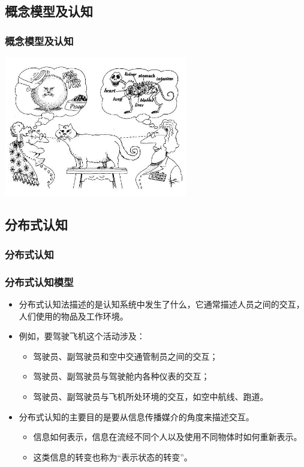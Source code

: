 \documentclass{beamer}
\begin{document}
\subsection{概念模型及认知}
\begin{frame}
	\frametitle{概念模型及认知}
	\begin{center}
		\includegraphics[width=8cm]{images/viewpoint.jpg}
	\end{center}
\end{frame}

\subsection{分布式认知}
\begin{frame}
	\frametitle{分布式认知}

\end{frame}

\begin{frame}
	\frametitle{分布式认知模型}
	\beamertemplatetransparentcovereddynamicmedium
	\begin{itemize}
		\item 分布式认知法描述的是认知系统中发生了什么，它通常描述人员之间的交互，人们使用的物品及工作环境。\pause
		\item 例如，要驾驶飞机这个活动涉及：
		\begin{itemize}
			\item 驾驶员、副驾驶员和空中交通管制员之间的交互；
			\item 驾驶员、副驾驶员与驾驶舱内各种仪表的交互；
			\item 驾驶员、副驾驶员与飞机所处环境的交互，如空中航线、跑道。
		\end{itemize}\pause
		\item 分布式认知的主要目的是要从信息传播媒介的角度来描述交互。
		\begin{itemize}
			\item 信息如何表示，信息在流经不同个人以及使用不同物体时如何重新表示。
			\item 这类信息的转变也称为“表示状态的转变”。
		\end{itemize}
	\end{itemize}
\end{frame}
\end{document}
